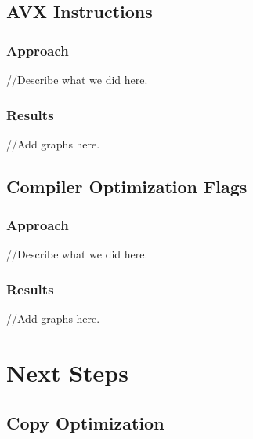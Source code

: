 \documentclass[11pt]{article}
\theoremstyle{plain}
\theoremstyle{definition}
\begin{document}
\subsection{AVX Instructions}
\subsubsection{Approach}
//Describe what we did here.
\subsubsection{Results}
//Add graphs here.

\subsection{Compiler Optimization Flags}
\subsubsection{Approach}
//Describe what we did here.
\subsubsection{Results}
//Add graphs here.

\section{Next Steps}
\subsection{Copy Optimization}





 
 
\end{document}

